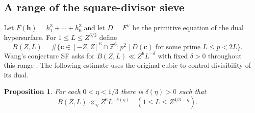 \documentclass[11pt,letterpaper]{article}
\newtheorem{proposition}[proposition]{Proposition}
\theoremstyle{definition}
\begin{document}
\subsection{A range of the square-divisor sieve}\label{c3:sieve}
Let $F(\mathbf h)=h_1^3+\cdots+h_6^3$ and let $D=F^\vee$ be the primitive
equation of the dual hypersurface. For $1\le L\le Z^{3/2}$ define
\[
 B(Z,L)=\#\{\mathbf c\in[-Z,Z]^6\cap\mathbb Z^6:
           p^2\mid D(\mathbf c)\text{ for some prime }L\le p<2L\}.
\]
Wang's conjecture SF asks for $B(Z,L)\ll Z^6L^{-\delta}$ with fixed
$\delta>0$ throughout this range \cite[Conjecture 1.6]{c3:wang}.
The following estimate uses the original cubic to control divisibility of
its dual.
\begin{proposition}\label{c3:sieveprop}
For each $0<\eta<1/3$ there is $\delta(\eta)>0$ such that
\[
 B(Z,L)\ll_\eta Z^6 L^{-\delta(\eta)}
 \quad (1\le L\le Z^{4/3-\eta}).
\]
\end{proposition}
\end{document}
